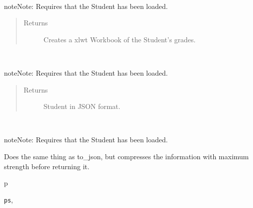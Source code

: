 \documentclass[letterpaper,10pt,english]{sphinxmanual}
\begin{document}
\begin{fulllineitems}

\begin{fulllineitems}
\label{index:ps.Student.to_excel}~
\begin{notice}{note}{Note:}
Requires that the Student has been loaded.
\end{notice}
\begin{quote}\begin{description}
\item[{Returns}] \leavevmode
Creates a xlwt Workbook of the Student's grades.

\end{description}\end{quote}

\end{fulllineitems}


\begin{fulllineitems}
\label{index:ps.Student.to_json}~
\begin{notice}{note}{Note:}
Requires that the Student has been loaded.
\end{notice}
\begin{quote}\begin{description}
\item[{Returns}] \leavevmode
Student in JSON format.

\end{description}\end{quote}

\end{fulllineitems}


\begin{fulllineitems}
\label{index:ps.Student.z_to_json}~
\begin{notice}{note}{Note:}
Requires that the Student has been loaded.
\end{notice}

Does the same thing as to\_json, but compresses the information with
maximum strength before returning it.

\end{fulllineitems}


\end{fulllineitems}



\renewcommand{\indexname}{Python Module Index}
\begin{theindex}
\def\bigletter#1{{\Large\sffamily#1}\nopagebreak\vspace{1mm}}
\bigletter{p}
\item {\texttt{ps}}, \pageref{index:module-ps}
\end{theindex}

\renewcommand{\indexname}{Index}
\printindex
\end{document}
